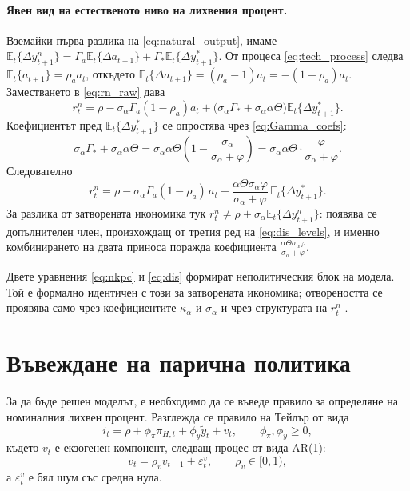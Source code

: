 \paragraph{Явен вид на естественото ниво на лихвения процент.}
Вземайки първа разлика на \eqref{eq:natural_output}, имаме
$\mathbb{E}_t\{\Delta y^n_{t+1}\} = \Gamma_a \mathbb{E}_t\{\Delta a_{t+1}\} + \Gamma_* \mathbb{E}_t\{\Delta y^*_{t+1}\}$.
От процеса \eqref{eq:tech_process} следва $\mathbb{E}_t\{a_{t+1}\} = \rho_a a_t$, откъдето
$\mathbb{E}_t\{\Delta a_{t+1}\} = (\rho_a - 1)a_t = -(1-\rho_a)a_t$.
Заместването в \eqref{eq:rn_raw} дава
\[
r^n_t = \rho - \sigma_\alpha \Gamma_a (1-\rho_a) a_t
+ \big( \sigma_\alpha \Gamma_* + \sigma_\alpha \alpha\Theta \big) \mathbb{E}_t\{\Delta y^*_{t+1}\}.
\]
Коефициентът пред $\mathbb{E}_t\{\Delta y^*_{t+1}\}$ се опростява чрез \eqref{eq:Gamma_coefs}:
\[
\sigma_\alpha \Gamma_* + \sigma_\alpha \alpha\Theta
= \sigma_\alpha \alpha\Theta \left( 1 - \frac{\sigma_\alpha}{\sigma_\alpha + \varphi} \right)
= \sigma_\alpha \alpha\Theta \cdot \frac{\varphi}{\sigma_\alpha + \varphi}.
\]
Следователно
\begin{equation}
r^n_t = \rho - \sigma_\alpha \Gamma_a (1-\rho_a)\, a_t
+ \frac{\alpha\Theta\sigma_\alpha\varphi}{\sigma_\alpha + \varphi}\, \mathbb{E}_t\{\Delta y^*_{t+1}\}.
\label{eq:rn}
\end{equation}
За разлика от затворената икономика тук $r^n_t \ne \rho + \sigma_\alpha\mathbb{E}_t\{\Delta y^n_{t+1}\}$: появява се допълнителен член, произхождащ от третия ред на \eqref{eq:dis_levels}, и именно комбинирането на двата приноса поражда коефициента $\frac{\alpha\Theta\sigma_\alpha\varphi}{\sigma_\alpha+\varphi}$.

Двете уравнения \eqref{eq:nkpc} и \eqref{eq:dis} формират неполитическия блок на модела. Той е формално идентичен с този за затворената икономика; отвореността се проявява само чрез коефициентите $\kappa_\alpha$ и $\sigma_\alpha$ и чрез структурата на $r^n_t$ \parencite[с.~165]{Gali2008}.

\section{Въвеждане на парична политика}

За да бъде решен моделът, е необходимо да се въведе правило за определяне на номиналния лихвен процент. Разглежда се правило на Тейлър от вида
\begin{equation}
i_t = \rho + \phi_\pi \pi_{H,t} + \phi_y \tilde{y}_t + v_t,
\qquad \phi_\pi, \phi_y \ge 0,
\label{eq:taylor}
\end{equation}
където $v_t$ е екзогенен компонент, следващ процес от вида AR(1):
\begin{equation}
v_t = \rho_v v_{t-1} + \varepsilon^v_t, \qquad \rho_v \in [0,1),
\label{eq:v_process}
\end{equation}
а $\varepsilon^v_t$ е бял шум със средна нула.

